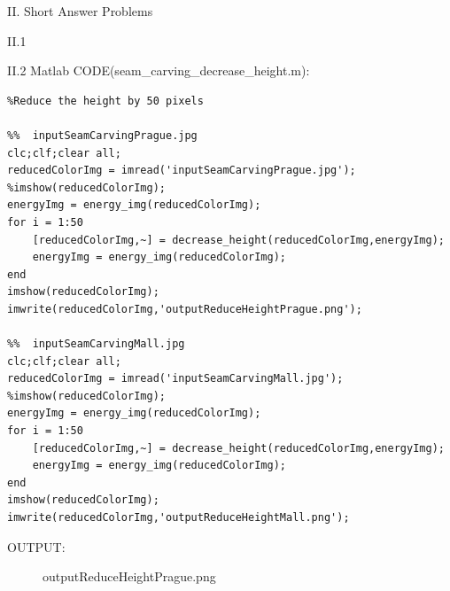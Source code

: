 \documentclass[a4paper,12pt]{article}
\begin{document}
\begin{section}{II. Short Answer Problems}
\begin{subsection}{II.1}
\end{subsection}
\clearpage

\begin{subsection}{II.2}
Matlab CODE(seam\_carving\_decrease\_height.m):\\
\begin{lstlisting}[frame=single]  % Start your code-block
%seam_carving_decrease_height.m
%Reduce the height by 50 pixels

%%  inputSeamCarvingPrague.jpg
clc;clf;clear all;
reducedColorImg = imread('inputSeamCarvingPrague.jpg');
%imshow(reducedColorImg);
energyImg = energy_img(reducedColorImg);
for i = 1:50
    [reducedColorImg,~] = decrease_height(reducedColorImg,energyImg);
    energyImg = energy_img(reducedColorImg);
end
imshow(reducedColorImg);
imwrite(reducedColorImg,'outputReduceHeightPrague.png');

%%  inputSeamCarvingMall.jpg
clc;clf;clear all;
reducedColorImg = imread('inputSeamCarvingMall.jpg');
%imshow(reducedColorImg);
energyImg = energy_img(reducedColorImg);
for i = 1:50
    [reducedColorImg,~] = decrease_height(reducedColorImg,energyImg);
    energyImg = energy_img(reducedColorImg);
end
imshow(reducedColorImg);
imwrite(reducedColorImg,'outputReduceHeightMall.png');

\end{lstlisting}

OUTPUT:\\

\begin{figure}[!htb]
        \caption{outputReduceHeightPrague.png}
      \end{figure}





\end{subsection}
\end{section}
\end{document}
